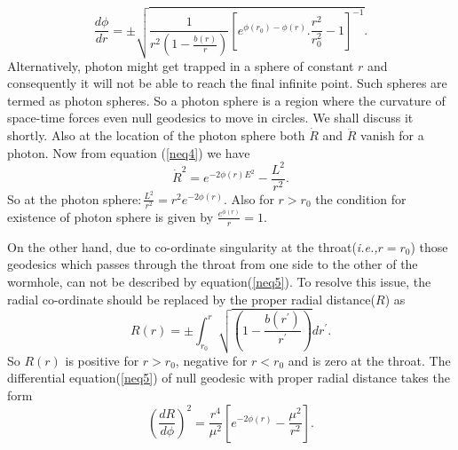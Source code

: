 \documentclass[10pt]{revtex4}
\begin{document}
 \begin{equation}
 \frac{d\phi}{dr}=\pm\sqrt{\frac{1}{r^2\left(1-\frac{b(r)}{r}\right)}\left[e^{\phi(r_0)-\phi(r)}.\frac{r^2}{r_0^2}-1\right]^{-1}}.
 \end{equation}
 Alternatively, photon might get trapped in a sphere of constant $r$ and consequently it will not be able to reach the final infinite point. Such spheres are termed as photon spheres. So a photon sphere is a region where the curvature of space-time forces even null geodesics to move in circles. We shall discuss it shortly.
 Also at the location of the photon sphere both $\dot{R}$ and $\ddot{R}$ vanish for a photon. Now from equation (\ref{neq4}) we have 
 \begin{equation}
 {\dot{R}}^2=e^{-2\phi(r)E^2}-\frac{L^2}{r^2}.
 \end{equation}
 So at the photon sphere$:\frac{L^2}{r^2}=r^2e^{-2\phi(r)}$. Also for $r>r_0$ the condition for existence of photon sphere is given by $\frac{e^{\phi(r)}}{r}=1$. 
 \par
 On the other hand, due to co-ordinate singularity at the throat({\it i.e.,$r=r_0$}) those geodesics which passes through the throat from one side to the other of the wormhole, can not be described by equation(\ref{neq5}). To resolve this issue, the radial co-ordinate should be replaced by the proper radial distance($R$) as 
 \begin{equation}
 R(r)=\pm\int_{r_0}^{r}\sqrt{\left(1-\frac{b(r^{'})}{r^{'}}\right)}dr^{'}.
 \end{equation}  
 So $R(r)$ is positive for $r>r_0$, negative for $r<r_0$ and is zero at the throat. The differential equation(\ref{neq5}) of null geodesic with proper radial distance takes the form 
 \begin{equation}\label{neq11}
 \left(\frac{dR}{d\phi}\right)^2=\frac{r^4}{\mu^2}\left[e^{-2\phi(r)}-\frac{\mu^2}{r^2}\right].
 \end{equation} 
\end{document}
